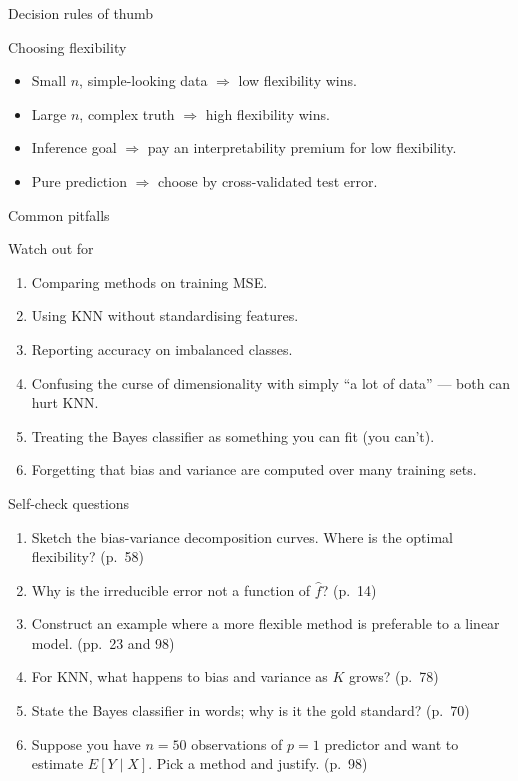 \documentclass[aspectratio=169,11pt]{beamer}
\begin{document}
\begin{frame}{Decision rules of thumb}
  \begin{block}{Choosing flexibility}
    \begin{itemize}
      \item Small $n$, simple-looking data $\Rightarrow$ low
            flexibility wins.
      \item Large $n$, complex truth $\Rightarrow$ high flexibility
            wins.
      \item Inference goal $\Rightarrow$ pay an interpretability
            premium for low flexibility.
      \item Pure prediction $\Rightarrow$ choose by cross-validated
            test error.
    \end{itemize}
  \end{block}
\end{frame}

\begin{frame}{Common pitfalls}
  \begin{alertblock}{Watch out for}
    \begin{enumerate}
      \item Comparing methods on training MSE.
      \item Using KNN without standardising features.
      \item Reporting accuracy on imbalanced classes.
      \item Confusing the curse of dimensionality with simply ``a lot
            of data'' --- both can hurt KNN.
      \item Treating the Bayes classifier as something you can fit
            (you can't).
      \item Forgetting that bias and variance are computed over many
            training sets.
    \end{enumerate}
  \end{alertblock}
\end{frame}

\begin{frame}{Self-check questions}
  \begin{enumerate}
    \item Sketch the bias-variance decomposition curves. Where is the
          optimal flexibility? (p.~58)
    \item Why is the irreducible error not a function of $\hat f$? (p.~14)
    \item Construct an example where a more flexible method is
          preferable to a linear model. (pp.~23 and 98)
    \item For KNN, what happens to bias and variance as $K$ grows? (p.~78)
    \item State the Bayes classifier in words; why is it the gold
          standard? (p.~70)
    \item Suppose you have $n = 50$ observations of $p = 1$ predictor
          and want to estimate $E[Y \mid X]$. Pick a method and
          justify. (p.~98)
  \end{enumerate}
\end{frame}
\end{document}
